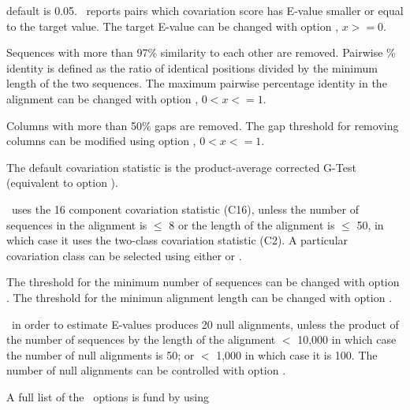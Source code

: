 \begin{sreitems}{}
\item[\emprog{Target E-value:}]default is 0.05. \rscape\, reports
  pairs which covariation score has E-value smaller or equal to the
  target value.  The target E-value can be changed with option
  , $x >= 0$.

\item[\emprog{Pairwise percent identity:}]Sequences with more than
  97\% similarity to each other are removed.  Pairwise \% identity is
  defined as the ratio of identical positions divided by the minimum
  length of the two sequences. The maximum pairwise percentage
  identity in the alignment can be changed with option , $0<x<=1$.

\item[\emprog{Gaps in columns}]Columns with more than 50\% gaps are
  removed. The gap threshold for removing columns can be modified
  using option  , $0<x<=1$.

\item[\emprog{Covariation statistic}]The default covariation statistic
  is the product-average corrected G-Test (equivalent to option
  ).

\item[\emprog{Covariation Class}]\rscape\ uses the 16 component
  covariation statistic (C16), unless the number of sequences in the
  alignment is $\leq$ 8 or the length of the alignment is $\leq$ 50,
  in which case it uses the two-class covariation statistic (C2). A
  particular covariation class can be selected using either
   or .

  The threshold for the minimum number of sequences can be changed
  with option .  The threshold for the minimun
  alignment length can be changed with option .

\item[\emprog{Null alignments:}]\rscape\ in order to estimate E-values
  produces 20 null alignments, unless the product of the number of
  sequences by the length of the alignment $<$ 10,000 in which case
  the number of null alignments is 50; or $<$ 1,000 in which case it
  is 100. The number of null alignments can be controlled with option
  .
\end{sreitems}

A full list of the \rscape\ options is fund by using


